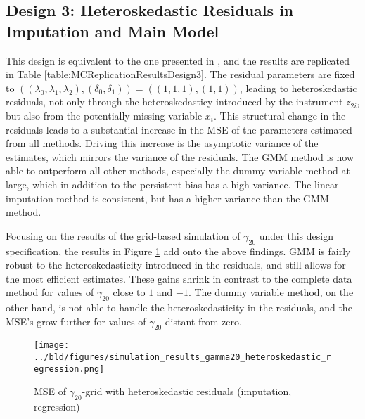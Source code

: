 \subsection{Design 3: Heteroskedastic Residuals in Imputation and Main Model}
This design is equivalent to the one presented in \citep{abrevaya2017}, and the results are replicated in Table \ref{table:MCReplicationResultsDesign3}.
The residual parameters are fixed to $((\lambda_0, \lambda_1, \lambda_2), (\delta_0, \delta_1)) = ((1, 1, 1), (1, 1))$, leading to heteroskedastic residuals, not only through the heteroskedasticy introduced by the instrument $z_{2i}$, but also from the potentially missing variable $x_i$.
This structural change in the residuals leads to a substantial increase in the MSE of the parameters estimated from all methods.
Driving this increase is the asymptotic variance of the estimates, which mirrors the variance of the residuals.
The GMM method is now able to outperform all other methods, especially the dummy variable method at large, which in addition to the persistent bias has a high variance.
The linear imputation method is consistent, but has a higher variance than the GMM method.



Focusing on the results of the grid-based simulation of $\gamma_{20}$ under this design specification, the results in Figure \ref{fig:gamma20_heteroskedastic_regression} add onto the above findings.
GMM is fairly robust to the heteroskedasticity introduced in the residuals, and still allows for the most efficient estimates.
These gains shrink in contrast to the complete data method for values of $\gamma_{20}$ close to $1$ and $-1$.
The dummy variable method, on the other hand, is not able to handle the heteroskedasticity in the residuals, and the MSE's grow further for values of $\gamma_{20}$ distant from zero.

\begin{figure}[H]
    \centering
    \texttt{[image: ../bld/figures/simulation\_results\_gamma20\_heteroskedastic\_regression.png]}
    \caption{MSE of $\gamma_{20}$-grid with heteroskedastic residuals (imputation, regression)}
    \label{fig:gamma20_heteroskedastic_regression}
\end{figure}

